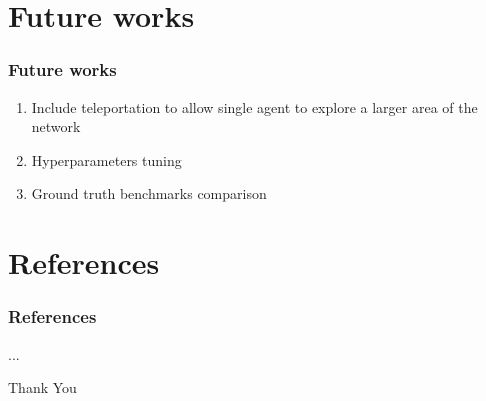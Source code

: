 \documentclass{beamer}
\begin{document}
\section{Future works}
\begin{frame}
\frametitle{Future works}
\begin{enumerate}
	\item Include teleportation to allow single agent to explore a larger area of the network
	\item Hyperparameters tuning
	\item Ground truth benchmarks comparison
\end{enumerate}
\end{frame}

\section*{References}
\begin{frame}
\frametitle{References}
...{\tiny }
\end{frame}

\begin{frame}
	\Huge{\centerline{Thank You}}
\end{frame}
\end{document}
